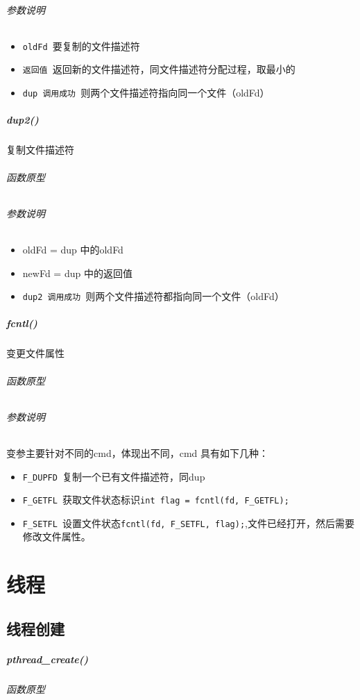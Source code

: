 \documentclass[UTF8,a4paper,12pt]{ctexbook}
\begin{document}
			\subparagraph{参数说明}
				\begin{itemize}[itemindent = 1em]
					\item \verb|oldFd |要复制的文件描述符
					\item \verb|返回值 |返回新的文件描述符，同文件描述符分配过程，取最小的
					\item \verb|dup 调用成功 |则两个文件描述符指向同一个文件（oldFd）
				\end{itemize}	
				
		\paragraph{dup2()}复制文件描述符
			\subparagraph{函数原型}
				
			\subparagraph{参数说明}
				\begin{itemize}[itemindent = 1em]
					\item oldFd = dup 中的oldFd
					\item newFd = dup 中的返回值
					\item \verb|dup2 调用成功 |则两个文件描述符都指向同一个文件（oldFd）
				\end{itemize}		
	
		\paragraph{fcntl()}变更文件属性
			\subparagraph{函数原型}
			
			\subparagraph{参数说明}
				变参主要针对不同的cmd，体现出不同，cmd 具有如下几种： 
				\begin{itemize}[itemindent = 1em]
					\item \verb|F_DUPFD |复制一个已有文件描述符，同dup				
					\item \verb|F_GETFL |获取文件状态标识\verb|int flag = fcntl(fd, F_GETFL);|
					\item \verb|F_SETFL |设置文件状态\verb|fcntl(fd, F_SETFL, flag);|,文件已经打开，然后需要修改文件属性。
				\end{itemize}
	
\chapter{线程}
	\section{线程创建}
		\paragraph{pthread\_create()}
				\subparagraph{函数原型}
					
\end{document}
